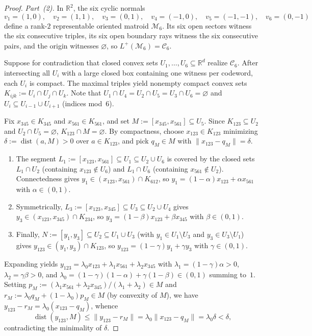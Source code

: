 \documentclass[11pt]{article}
\theoremstyle{plain}
\theoremstyle{definition}
\theoremstyle{remark}
\DeclareMathOperator{\dist}{dist}
\begin{document}
\begin{proof}
\emph{Part~(2).} In $\mathbb{R}^2$, the six cyclic normals
\[
v_1 = (1,0),\quad v_2 = (1,1),\quad v_3 = (0,1),\quad v_4 = (-1,0),\quad v_5 = (-1,-1),\quad v_6 = (0,-1)
\]
define a rank-$2$ representable oriented matroid $\mathcal{M}_6$. Its six open sectors witness the six consecutive triples, its six open boundary rays witness the six consecutive pairs, and the origin witnesses $\varnothing$, so $L^+(\mathcal{M}_6) = \mathcal{C}_6$.

Suppose for contradiction that closed convex sets $U_1, \dots, U_6 \subseteq \mathbb{R}^d$ realize $\mathcal{C}_6$. After intersecting all $U_i$ with a large closed box containing one witness per codeword, each $U_i$ is compact. The maximal triples yield nonempty compact convex sets $K_{ijk} := U_i \cap U_j \cap U_k$. Note that $U_1 \cap U_4 = U_2 \cap U_5 = U_3 \cap U_6 = \varnothing$ and $U_i \subseteq U_{i-1} \cup U_{i+1}$ (indices mod~$6$).

Fix $x_{345} \in K_{345}$ and $x_{561} \in K_{561}$, and set $M := [x_{345}, x_{561}] \subseteq U_5$. Since $K_{123} \subseteq U_2$ and $U_2 \cap U_5 = \varnothing$, $K_{123} \cap M = \varnothing$. By compactness, choose $x_{123} \in K_{123}$ minimizing $\delta := \dist(a, M) > 0$ over $a \in K_{123}$, and pick $q_M \in M$ with $\|x_{123} - q_M\| = \delta$.
\begin{enumerate}[label=\textup{(\roman*)}]
\item The segment $L_1 := [x_{123}, x_{561}] \subseteq U_1 \subseteq U_2 \cup U_6$ is covered by the closed sets $L_1 \cap U_2$ (containing $x_{123} \notin U_6$) and $L_1 \cap U_6$ (containing $x_{561} \notin U_2$). Connectedness gives $y_1 \in (x_{123}, x_{561}) \cap K_{612}$, so $y_1 = (1 - \alpha)x_{123} + \alpha x_{561}$ with $\alpha \in (0, 1)$.
\item Symmetrically, $L_3 := [x_{123}, x_{345}] \subseteq U_3 \subseteq U_2 \cup U_4$ gives $y_3 \in (x_{123}, x_{345}) \cap K_{234}$, so $y_3 = (1 - \beta)x_{123} + \beta x_{345}$ with $\beta \in (0, 1)$.
\item Finally, $N := [y_1, y_3] \subseteq U_2 \subseteq U_1 \cup U_3$ (with $y_1 \in U_1 \setminus U_3$ and $y_3 \in U_3 \setminus U_1$) gives $y_{123} \in (y_1, y_3) \cap K_{123}$, so $y_{123} = (1 - \gamma)y_1 + \gamma y_3$ with $\gamma \in (0, 1)$.
\end{enumerate}
Expanding yields $y_{123} = \lambda_0 x_{123} + \lambda_1 x_{561} + \lambda_2 x_{345}$ with $\lambda_1 = (1-\gamma)\alpha > 0$, $\lambda_2 = \gamma\beta > 0$, and $\lambda_0 = (1-\gamma)(1-\alpha) + \gamma(1-\beta) \in (0, 1)$ summing to~$1$. Setting $p_M := (\lambda_1 x_{561} + \lambda_2 x_{345})/(\lambda_1 + \lambda_2) \in M$ and $r_M := \lambda_0 q_M + (1 - \lambda_0)p_M \in M$ (by convexity of $M$), we have $y_{123} - r_M = \lambda_0(x_{123} - q_M)$, whence
\[
\dist(y_{123}, M) \le \|y_{123} - r_M\| = \lambda_0\|x_{123} - q_M\| = \lambda_0\delta < \delta,
\]
contradicting the minimality of $\delta$.
\end{proof}
\end{document}
